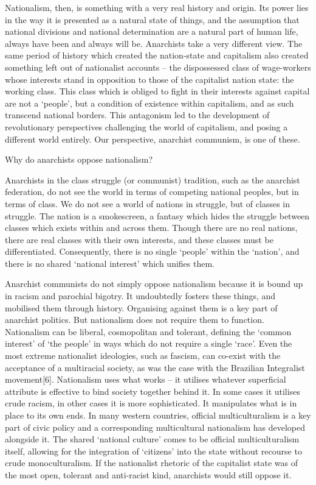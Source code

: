 Nationalism, then, is something with a very real history and origin.
Its power lies in the way it is presented as a natural state of things, and the assumption that national divisions and national determination are a natural part of human life, always have been and always will be.
Anarchists take a very different view.
The same period of history which created the nation-state and capitalism also created something left out of nationalist accounts – the dispossessed class of wage-workers whose interests stand in opposition to those of the capitalist nation state: the working class.
This class which is obliged to fight in their interests against capital are not a ‘people’, but a condition of existence within capitalism, and as such transcend national borders.
This antagonism led to the development of revolutionary perspectives challenging the world of capitalism, and posing a different world entirely.
Our perspective, anarchist communism, is one of these.

Why do anarchists oppose nationalism?

Anarchists in the class struggle (or communist) tradition, such as the anarchist federation, do not see the world in terms of competing national peoples, but in terms of class.
We do not see a world of nations in struggle, but of classes in struggle.
The nation is a smokescreen, a fantasy which hides the struggle between classes which exists within and across them.
Though there are no real nations, there are real classes with their own interests, and these classes must be differentiated.
Consequently, there is no single ‘people’ within the ‘nation’, and there is no shared ‘national interest’ which unifies them.

Anarchist communists do not simply oppose nationalism because it is bound up in racism and parochial bigotry.
It undoubtedly fosters these things, and mobilised them through history.
Organising against them is a key part of anarchist politics.
But nationalism does not require them to function.
Nationalism can be liberal, cosmopolitan and tolerant, defining the ‘common interest’ of ‘the people’ in ways which do not require a single ‘race’.
Even the most extreme nationalist ideologies, such as fascism, can co-exist with the acceptance of a multiracial society, as was the case with the Brazilian Integralist movement[6].
Nationalism uses what works – it utilises whatever superficial attribute is effective to bind society together behind it.
In some cases it utilises crude racism, in other cases it is more sophisticated.
It manipulates what is in place to its own ends.
In many western countries, official multiculturalism is a key part of civic policy and a corresponding multicultural nationalism has developed alongside it.
The shared ‘national culture’ comes to be official multiculturalism itself, allowing for the integration of ‘citizens’ into the state without recourse to crude monoculturalism.
If the nationalist rhetoric of the capitalist state was of the most open, tolerant and anti-racist kind, anarchists would still oppose it.

